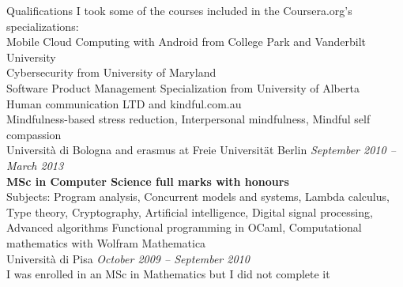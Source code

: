 \documentclass{resume}
\begin{document}
  \begin{rSection}{Qualifications} 
    I took some of the courses included in the Coursera.org's  specializations:\\
    Mobile Cloud Computing with Android from College Park and Vanderbilt University\\
    Cybersecurity from University of Maryland\\
    Software Product Management Specialization from University of Alberta\\

    Human communication LTD and kindful.com.au\hfill \\
    Mindfulness-based stress reduction, 
    Interpersonal mindfulness,
    Mindful self compassion\\


    Universit\`a di Bologna and erasmus at Freie Universit\"at Berlin \hfill {\em September 2010 -- March 2013} \\
    {\bf MSc in Computer Science full marks with honours}\\
    Subjects:
        Program analysis, Concurrent models and systems, Lambda calculus,
	    Type theory, Cryptography, Artificial intelligence, Digital signal processing,
	    Advanced algorithms
	    Functional programming in OCaml, Computational mathematics with Wolfram Mathematica\\
 
    Universit\`a di Pisa \hfill {\em October 2009 -- September 2010} \\
    I was enrolled in an MSc in Mathematics but I did not complete it\\


\end{rSection}
\end{document}
